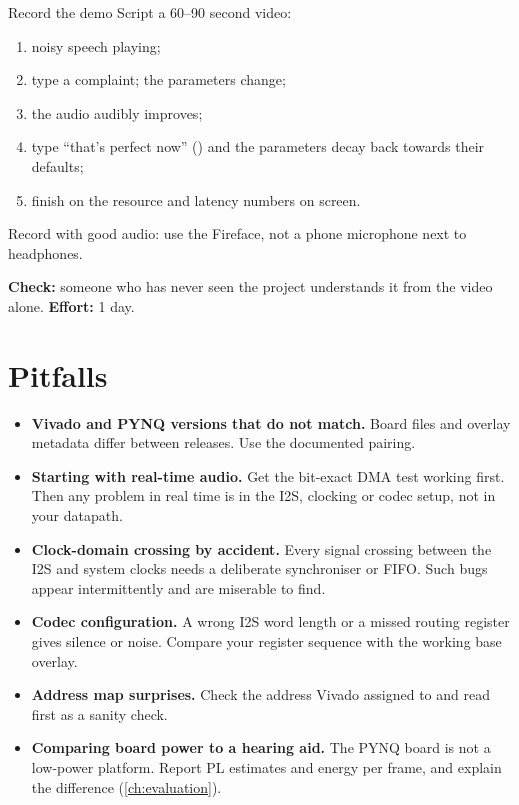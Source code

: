 \begin{stepbox}[label=st:fpga:demo]{Record the demo}
Script a 60--90 second video:
\begin{enumerate}
  \item noisy speech playing;
  \item type a complaint; the parameters change;
  \item the audio audibly improves;
  \item type \enquote{that's perfect now} () and the parameters
        decay back towards their defaults;
  \item finish on the resource and latency numbers on screen.
\end{enumerate}
Record with good audio: use the Fireface, not a phone microphone next to
headphones.

\textbf{Check:} someone who has never seen the project understands it from the
video alone. \textbf{Effort:} 1 day.
\end{stepbox}

\section{Pitfalls}\label{sec:fpga:pitfalls}

\begin{pitfallbox}
\begin{itemize}
  \item \textbf{Vivado and PYNQ versions that do not match.} Board files and
        overlay metadata differ between releases. Use the documented pairing.
  \item \textbf{Starting with real-time audio.} Get the bit-exact DMA test
        working first. Then any problem in real time is in the I2S, clocking or
        codec setup, not in your datapath.
  \item \textbf{Clock-domain crossing by accident.} Every signal crossing
        between the I2S and system clocks needs a deliberate synchroniser or
        FIFO. Such bugs appear intermittently and are miserable to find.
  \item \textbf{Codec configuration.} A wrong I2S word length or a missed
        routing register gives silence or noise. Compare your register
        sequence with the working base overlay.
  \item \textbf{Address map surprises.} Check the address Vivado assigned to
         and read  first as a sanity check.
  \item \textbf{Comparing board power to a hearing aid.} The PYNQ board is not
        a low-power platform. Report PL estimates and energy per frame, and
        explain the difference (\cref{ch:evaluation}).
\end{itemize}
\end{pitfallbox}

